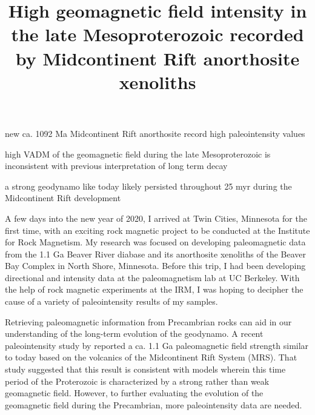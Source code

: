 \documentclass[draft]{agujournal2019}
\begin{document}
\title{High geomagnetic field intensity in the late Mesoproterozoic recorded by Midcontinent Rift anorthosite xenoliths}





\begin{keypoints}
\item new ca. 1092 Ma Midcontinent Rift anorthosite record high paleointensity values
\item high VADM of the geomagnetic field during the late Mesoproterozoic is inconsistent with previous interpretation of long term decay
\item a strong geodynamo like today likely persisted throughout 25 myr during the Midcontinent Rift development
\end{keypoints}


A few days into the new year of 2020, I arrived at Twin Cities, Minnesota for the first time, with an exciting rock magnetic project to be conducted at the Institute for Rock Magnetism. My research was focused on developing paleomagnetic data from the 1.1 Ga Beaver River diabase and its anorthosite xenoliths of the Beaver Bay Complex in North Shore, Minnesota. Before this trip, I had been developing directional and intensity data at the paleomagnetism lab at UC Berkeley. With the help of rock magnetic experiments at the IRM, I was hoping to decipher the cause of a variety of paleointensity results of my samples. 

Retrieving paleomagnetic information from Precambrian rocks can aid in our understanding of the long-term evolution of the geodynamo. A recent paleointensity study by \cite{Sprain2018a} reported a ca. 1.1 Ga paleomagnetic field strength similar to today based on the volcanics of the Midcontinent Rift System (MRS). That study suggested that this result is consistent with models wherein this time period of the Proterozoic is characterized by a strong rather than weak geomagnetic field. However, to further evaluating the evolution of the geomagnetic field during the Precambrian, more paleointensity data are needed. 
\end{document}
